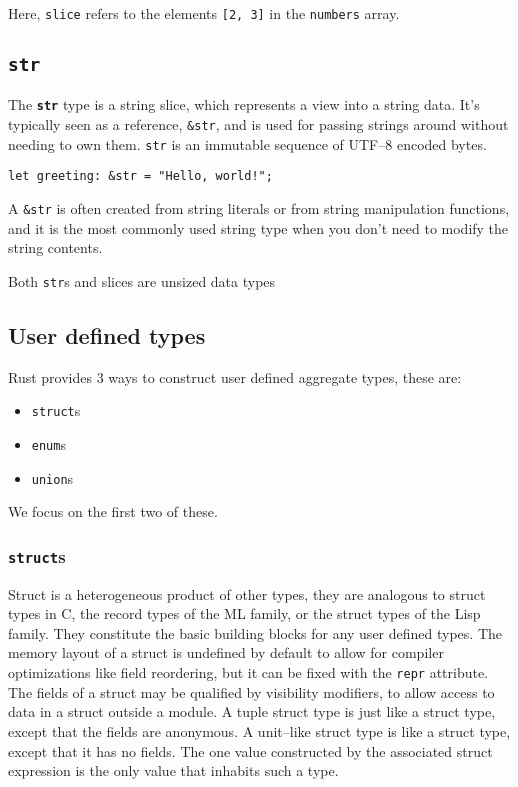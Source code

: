 Here, \texttt{slice} refers to the elements \texttt{[2, 3]} in the \texttt{numbers} array.

\subsection{\texttt{str}}
The \textbf{\texttt{str}} type is a string slice, which represents a view into a string data. It's typically seen as a reference, 
\texttt{\&str}, and is used for passing strings around without needing to own them. \texttt{str} is an immutable sequence of UTF--8 encoded bytes.

\begin{lstlisting}
let greeting: &str = "Hello, world!";
\end{lstlisting}

A \texttt{\&str} is often created from string literals or from string manipulation functions, and it is the most commonly used string type when you don't need to modify the string contents.

Both \texttt{str}s and slices are unsized data types 

\subsection{User defined types}

Rust provides 3 ways to construct user defined aggregate types, these are:
\begin{itemize}
    \item \texttt{struct}s
    \item \texttt{enum}s
    \item \texttt{union}s
\end{itemize}

We focus on the first two of these.

\subsubsection{\texttt{struct}s}

Struct is a heterogeneous product of other types, they are analogous to struct types in C, the record types of the ML family, or the struct types of the Lisp family. 
They constitute the basic building blocks for any user defined types. The memory layout of a struct is undefined by default to allow for compiler optimizations like field reordering, 
but it can be fixed with the \texttt{repr} attribute. The fields of a struct may be qualified by visibility modifiers, to allow access to data in a struct outside a module.
A tuple struct type is just like a struct type, except that the fields are anonymous. 
A unit--like struct type is like a struct type, except that it has no fields. The one value constructed by the associated struct expression is the only value that inhabits such a type.
\cite{rustreference}

